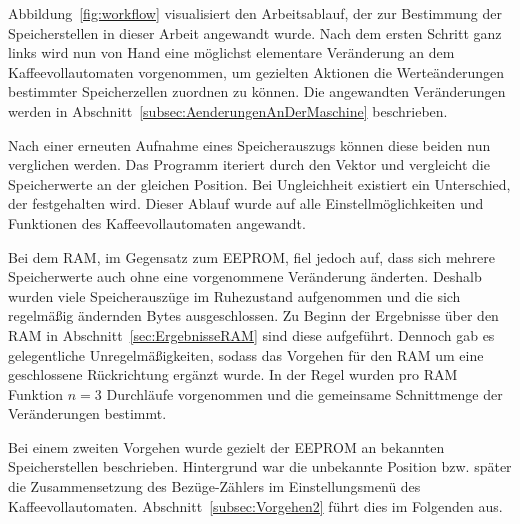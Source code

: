 Abbildung~\ref{fig:workflow} visualisiert den Arbeitsablauf, der zur Bestimmung der Speicherstellen in dieser Arbeit angewandt wurde.
Nach dem ersten Schritt ganz links wird nun von Hand eine möglichst elementare Veränderung an dem Kaffeevollautomaten vorgenommen, um gezielten Aktionen die Werteänderungen bestimmter Speicherzellen zuordnen zu können.
Die angewandten Veränderungen werden in Abschnitt~\ref{subsec:AenderungenAnDerMaschine} beschrieben.

Nach einer erneuten Aufnahme eines Speicherauszugs können diese beiden nun verglichen werden.
Das Programm iteriert durch den Vektor und vergleicht die Speicherwerte an der gleichen Position.
Bei Ungleichheit existiert ein Unterschied, der festgehalten wird.
Dieser Ablauf wurde auf alle Einstellmöglichkeiten und Funktionen des Kaffeevollautomaten angewandt.

Bei dem \ac{RAM}, im Gegensatz zum \ac{EEPROM}, fiel jedoch auf, dass sich mehrere Speicherwerte auch ohne eine vorgenommene Veränderung änderten.
Deshalb wurden viele Speicherauszüge im Ruhezustand aufgenommen und die sich regelmäßig ändernden Bytes ausgeschlossen.
Zu Beginn der Ergebnisse über den \ac{RAM} in Abschnitt~\ref{sec:ErgebnisseRAM} sind diese aufgeführt.
Dennoch gab es gelegentliche Unregelmäßigkeiten, sodass das Vorgehen für den \ac{RAM} um eine geschlossene Rückrichtung ergänzt wurde.
In der Regel wurden pro \ac{RAM} Funktion $n=3$ Durchläufe vorgenommen und die gemeinsame Schnittmenge der Veränderungen bestimmt.

Bei einem zweiten Vorgehen wurde gezielt der \ac{EEPROM} an bekannten Speicherstellen beschrieben.
Hintergrund war die unbekannte Position bzw. später die Zusammensetzung des Bezüge-Zählers im Einstellungsmenü des Kaffeevollautomaten.
Abschnitt~\ref{subsec:Vorgehen2} führt dies im Folgenden aus.


